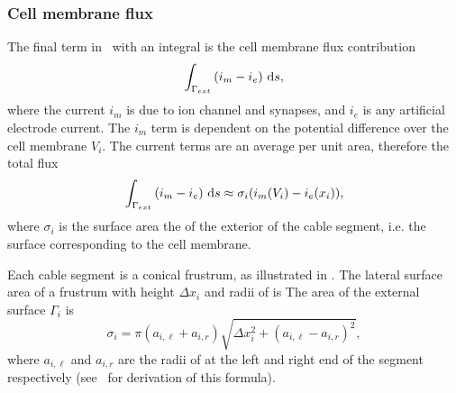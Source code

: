 \subsubsection{Cell membrane flux}
The final term in~ with an integral is the cell membrane flux contribution
\begin{equation}
    \int_{\Gamma_{ext}} {(i_m - i_e)} ~\text{d}{s},
\end{equation}
where the current $i_m$ is due to ion channel and synapses, and $i_e$ is any artificial electrode current.
The $i_m$ term is dependent on the potential difference over the cell membrane $V_i$.
The current terms are an average per unit area, therefore the total flux 
\begin{equation}
    \int_{\Gamma_{ext}} {(i_m - i_e)} ~\text{d}{s}
        \approx
    \sigma_i(i_m(V_i) - i_e(x_i)),
        \label{eq:J_im}
\end{equation}
where $\sigma_i$ is the surface area the of the exterior of the cable segment, i.e. the surface corresponding to the cell membrane.

Each cable segment is a conical frustrum, as illustrated in .
The lateral surface area of a frustrum with height $\Delta x_i$ and radii of  is
The area of the external surface $\Gamma_{i}$ is
\begin{equation}
    \sigma_i = \pi (a_{i,\ell} + a_{i,r}) \sqrt{\Delta x_i^2 + (a_{i,\ell} - a_{i,r})^2},
    \label{eq:cv_volume}
\end{equation}
where $a_{i,\ell}$ and $a_{i,r}$ are the radii of at the left and right end of the segment respectively (see~ for derivation of this formula).
